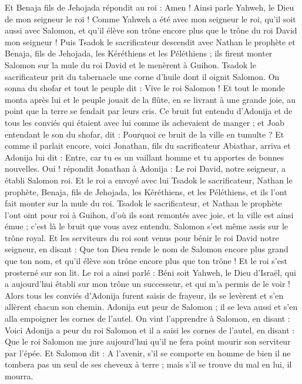 \begin{multicols}{2}
Et Benaja fils de Jehojada répondit au roi : Amen ! Ainsi parle Yahweh, le Dieu de mon seigneur le roi !
Comme Yahweh a été avec mon seigneur le roi, qu'il soit aussi avec Salomon, et qu'il élève son trône encore plus que le trône du roi David mon seigneur !
Puis Tsadok le sacrificateur descendit avec Nathan le prophète et Benaja, fils de Jehojada, les Kéréthiens et les Péléthiens ; ils firent monter Salomon sur la mule du roi David et le menèrent à Guihon.
Tsadok le sacrificateur prit du tabernacle une corne d'huile dont il oignit Salomon. On sonna du shofar et tout le peuple dit : Vive le roi Salomon !
Et tout le monde monta après lui et le peuple jouait de la flûte, en se livrant à une grande joie, au point que la terre se fendait par leurs cris.
Ce bruit fut entendu d’Adonija et de tous les conviés qui étaient avec lui comme ils achevaient de manger ; et Joab entendant le son du shofar, dit : Pourquoi ce bruit de la ville en tumulte ?
Et comme il parlait encore, voici Jonathan, fils du sacrificateur Abiathar, arriva et Adonija lui dit : Entre, car tu es un vaillant homme et tu apportes de bonnes nouvelles.
Oui ! répondit Jonathan à Adonija : Le roi David, notre seigneur, a établi Salomon roi.
Et le roi a envoyé avec lui Tsadok le sacrificateur, Nathan le prophète, Benaja, fils de Jehojada, les Kéréthiens, et les Péléthiens, et ils l'ont fait monter sur la mule du roi.
Tsadok le sacrificateur, et Nathan le prophète l'ont oint pour roi à Guihon, d'où ils sont remontés avec joie, et la ville est ainsi émue ; c'est là le bruit que vous avez entendu.
Salomon s'est même assis sur le trône royal.
Et les serviteurs du roi sont venus pour bénir le roi David notre seigneur, en disant : Que ton Dieu rende le nom de Salomon encore plus grand que ton nom, et qu'il élève son trône encore plus que ton trône ! Et le roi s'est prosterné sur son lit.
Le roi a ainsi parlé : Béni soit Yahweh, le Dieu d'Israël, qui a aujourd’hui établi sur mon trône un successeur, et qui m’a permis de le voir !
Alors tous les conviés d’Adonija furent saisis de frayeur, ils se levèrent et s'en allèrent chacun son chemin.
Adonija eut peur de Salomon ; il se leva aussi et s'en alla empoigner les cornes de l'autel.
On vint l’apprendre à Salomon, en disant : Voici Adonija a peur du roi Salomon et il a saisi les cornes de l'autel, en disant : Que le roi Salomon me jure aujourd'hui qu'il ne fera point mourir son serviteur par l'épée.
Et Salomon dit : A l’avenir, s’il se comporte en homme de bien il ne tombera pas un seul de ses cheveux à terre ; mais s'il se trouve du mal en lui, il mourra.

\end{multicols}
